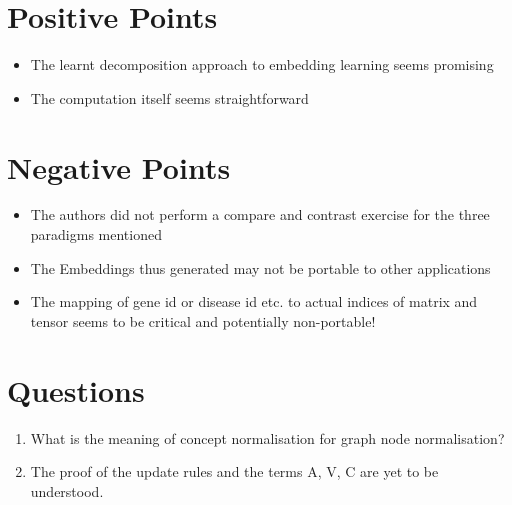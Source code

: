 \section{Positive Points}
\begin{itemize}
    \item The learnt decomposition approach to embedding learning seems promising
    \item The computation itself seems straightforward
\end{itemize}


\section{Negative Points}
\begin{itemize}
    \item The authors did not perform a compare and contrast exercise for the three
        paradigms mentioned
    \item The Embeddings thus generated may not be portable to other applications
    \item The mapping of gene id or disease id etc. to actual indices of matrix and
        tensor seems to be critical and potentially non-portable!
\end{itemize}


\section{Questions}
\begin{enumerate}
    \item What is the meaning of concept normalisation for graph node normalisation?
    \item The proof of the update rules and the terms A, V, C are yet to be understood.
\end{enumerate}